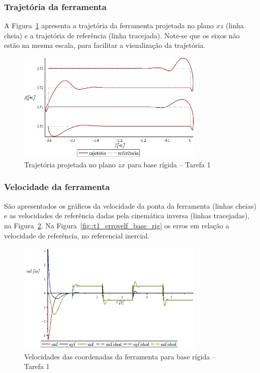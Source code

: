 \subsubsection{Trajetória da ferramenta}

A Figura~\ref{fig::t1_traj_base_rig} apresenta a trajetória da ferramenta
projetada no plano $xz$ (linha cheia) e a trajetória de referência (linha
tracejada).
Note-se que os eixos não estão na mesma escala, para facilitar a visualização da
trajetória.

\begin{figure}[h!]
	\centering 
 	\includegraphics[width=0.80\textwidth]{figs/t1_traj_base_rig}
 	\caption{Trajetória projetada no plano $zx$ para base rígida -- Tarefa 1}
 	\label{fig::t1_traj_base_rig}
\end{figure}


\subsubsection{Velocidade da ferramenta}

São apresentados os gráficos da velocidade da ponta da ferramenta (linhas
cheias) e as velocidades de referência dadas pela cinemática inversa (linhas
tracejadas), na Figura~\ref{fig::t1_velf_base_rig}. Na
Figura~\ref{fig::t1_errovelf_base_rig} os erros em relação a velocidade de
referência, no referencial inercial.

\begin{figure}[h!]
	\centering 
 	\includegraphics[width=0.80\textwidth]{figs/t1_velf_base_rig}
 	\caption{Velocidades das coordenadas da ferramenta para base rígida -- Tarefa 1}
 	\label{fig::t1_velf_base_rig}
\end{figure}

